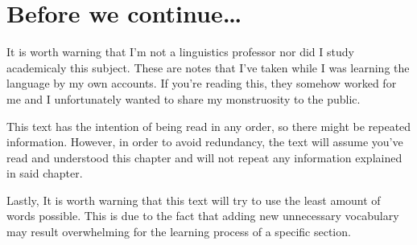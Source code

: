\section*{Before we continue\dots}

It is worth warning that I'm not a linguistics professor nor did I study academicaly this subject. These are notes that I've taken while I was learning the language by my own accounts. If you're reading this, they somehow worked for me and I unfortunately wanted to share my monstruosity to the public.

This text has the intention of being read in any order, so there might be repeated information. However, in order to avoid redundancy, the text will assume you've read and understood this chapter and will not repeat any information explained in said chapter.

Lastly, It is worth warning that this text will try to use the least amount of words possible. This is due to the fact that adding new unnecessary vocabulary may result overwhelming for the learning process of a specific section. 
